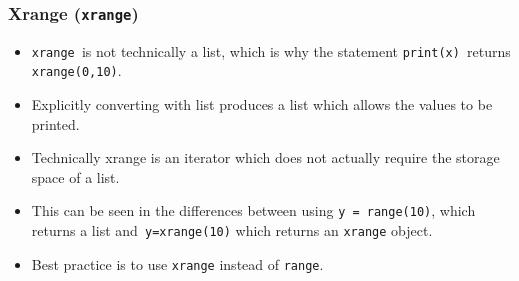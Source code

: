 \documentclass[KSmainSlides.tex]{subfiles}
\begin{document}
\begin{frame}

\frametitle{Xrange (\texttt{xrange})}
\begin{itemize}
\item \texttt{xrange }is not technically a list, which is why the statement \texttt{print(x) }returns \texttt{xrange(0,10)}. 
\item Explicitly
converting with list produces a list which allows the values to be printed. 
\item Technically xrange is an iterator
which does not actually require the storage space of a list. 
\item This can be seen in the differences between
using \texttt{y = range(10)}, which returns a list and\texttt{ y=xrange(10)} which returns an \texttt{xrange} object. 
\item Best practice
is to use \texttt{xrange} instead of \texttt{range}.
\end{itemize}
\end{frame}
\end{document}
